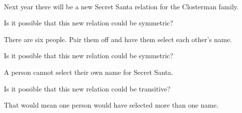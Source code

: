 \documentclass{ximera}
\begin{document}
\begin{exercise}
\quad \\
Next year there will be a new Secret Santa relation for the Closterman family.


\begin{problem} Is it possible that this new relation could be symmetric? 
\begin{feedback}
There are six people. Pair them off and have them select each other's name.
\end{feedback}
\end{problem}



\begin{problem} Is it possible that this new relation could be symmetric? 
\begin{feedback}
A person cannot select their own name for Secret Santa.
\end{feedback}
\end{problem}




\begin{problem} Is it possible that this new relation could be transitive? 
\begin{feedback}
That would mean one person would have selected more than one name.
\end{feedback}
\end{problem}


\end{exercise}
\end{document}
